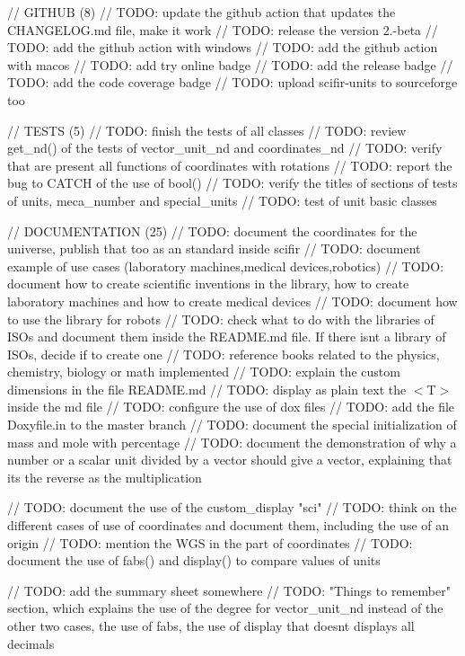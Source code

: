 // GITHUB (8) // TODO\+: update the github action that updates the CHANGELOG.\+md file, make it work // TODO\+: release the version 2.-\/beta // TODO\+: add the github action with windows // TODO\+: add the github action with macos // TODO\+: add try online badge // TODO\+: add the release badge // TODO\+: add the code coverage badge // TODO\+: upload scifir-\/units to sourceforge too

// TESTS (5) // TODO\+: finish the tests of all classes // TODO\+: review get\+\_\+nd() of the tests of vector\+\_\+unit\+\_\+nd and coordinates\+\_\+nd // TODO\+: verify that are present all functions of coordinates with rotations // TODO\+: report the bug to CATCH of the use of bool() // TODO\+: verify the titles of sections of tests of units, meca\+\_\+number and special\+\_\+units // TODO\+: test of unit basic classes

// DOCUMENTATION (25) // TODO\+: document the coordinates for the universe, publish that too as an standard inside scifir // TODO\+: document example of use cases (laboratory machines,medical devices,robotics) // TODO\+: document how to create scientific inventions in the library, how to create laboratory machines and how to create medical devices // TODO\+: document how to use the library for robots // TODO\+: check what to do with the libraries of ISOs and document them inside the README.\+md file. If there isn\textquotesingle{}t a library of ISOs, decide if to create one // TODO\+: reference books related to the physics, chemistry, biology or math implemented // TODO\+: explain the custom dimensions in the file README.\+md // TODO\+: display as plain text the $<$\+T$>$ inside the md file // TODO\+: configure the use of dox files // TODO\+: add the file Doxyfile.\+in to the master branch // TODO\+: document the special initialization of mass and mole with percentage // TODO\+: document the demonstration of why a number or a scalar unit divided by a vector should give a vector, explaining that it\textquotesingle{}s the reverse as the multiplication

// TODO\+: document the use of the custom\+\_\+display "{}sci"{} // TODO\+: think on the different cases of use of coordinates and document them, including the use of an origin // TODO\+: mention the WGS in the part of coordinates // TODO\+: document the use of fabs() and display() to compare values of units

// TODO\+: add the summary sheet somewhere // TODO\+: "{}\+Things to remember"{} section, which explains the use of the degree for vector\+\_\+unit\+\_\+nd instead of the other two cases, the use of fabs, the use of display that doesn\textquotesingle{}t displays all decimals

